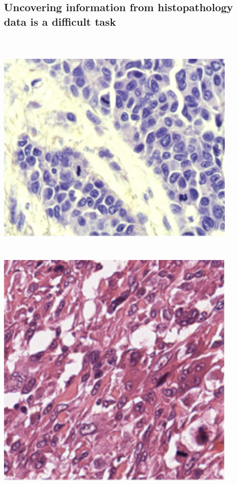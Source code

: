 \documentclass[a0,portrait]{a0poster}
\begin{document}
\begin{multicols}{2}
\section*{Uncovering information from histopathology data is a difficult task}

\begin{center}

  \includegraphics[height=12cm, width = 12cm]{histo1.png}
  \includegraphics[height=12cm, width = 12cm]{histo2.png}

\end{center}
\end{multicols}
\end{document}

